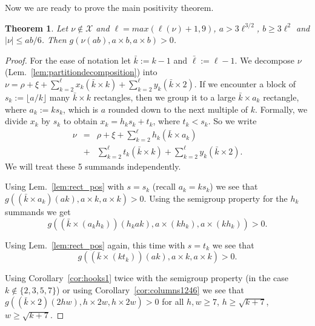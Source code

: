 \documentclass{article}
\numberwithin{equation}{section}
\newtheorem{theorem}[equation]{Theorem}
\theoremstyle{definition}
\newcommand{\exceptions}{{\mathscr{X}}}
\begin{document}
Now we are ready to prove the main positivity theorem.
\begin{theorem}\label{thm:mainpositivityresult}
Let $\nu \notin \exceptions$ and $\ell = max(\ell(\nu)+1,9)$,
$a >  3\ell^{3/2}$, %
$b \geq 3 \ell^2$ and
$|\nu| \leq ab/6$.
Then $g(\nu(ab),a \times b, a \times b)>0$.
\end{theorem}
\begin{proof}
For the ease of notation let $\bar k := k-1$ and $\bar \ell := \ell-1$.
We decompose $\nu$ (Lem.~\ref{lem:partitiondecomposition}) into
$
\nu = \rho + \xi + \sum_{k=2}^\ell x_k (\bar k \times k) + \sum_{k=2}^\ell y_k (\bar k \times 2).
$
If we encounter a block of $s_k := \lfloor a/k\rfloor$ many $\bar k \times k$ rectangles, then we group it
to a large $\bar k\times a_k$ rectangle, where $a_k := k s_k$,
which is $a$ rounded down to the next multiple of $k$.
Formally,
we divide $x_k$ by $s_k$ to obtain $x_k = h_k s_k + t_k$,
where $t_k < s_k$.
So we write
\begin{eqnarray*} 
\nu &=& \textstyle\rho + \xi + \sum_{k=2}^\ell h_k (\bar k \times a_k) \\
&+&\textstyle\sum_{k=2}^\ell t_k (\bar k \times k) + \sum_{k=2}^\ell y_k (\bar k \times 2).
\end{eqnarray*}
We will treat these 5 summands independently.

Using Lem.~\ref{lem:rect_pos} with $s=s_k$ (recall $a_k=k s_k$) we see that
$
g( (\bar k \times a_k)(ak), a \times k, a \times k)>0.
$
Using the semigroup property for the $h_k$ summands we get
\begin{equation}\label{eq:summandI}
g( (\bar k \times (a_k h_k))(h_k a k), a \times (k h_k), a \times (k h_k))>0.
\end{equation}

Using Lem.~\ref{lem:rect_pos} again, this time with $s=t_k$ we see that
\begin{equation}\label{eq:summandII}
g( (\bar k \times (k t_k))(ak), a \times k, a \times k)>0.
\end{equation}



Using Corollary~\ref{cor:hooks1} twice with the semigroup property
(in the case $k \notin\{2,3,5,7\}$)
or using Corollary~\ref{cor:columns1246} we see that
$
g((\bar k \times 2)(2hw),h \times 2w, h \times 2w) > 0
$
for all $h,w \geq 7$, $h \geq \sqrt{ k+7}$, $w \geq \sqrt{ k+7}$.



\end{proof}
\end{document}
